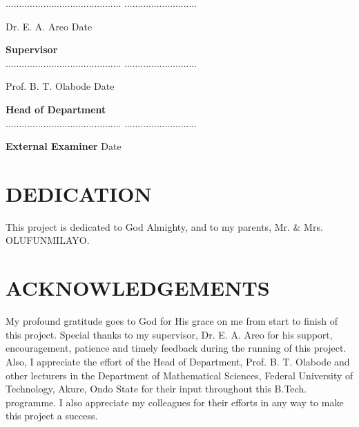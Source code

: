 \documentclass[12pt]{report}
\begin{document}
\noindent........................................... \hspace{10.7cm}
...........................

Dr. E. A. Areo \hspace{13cm} Date

\hspace{6mm}\textbf{Supervisor}\\
[2cm] 

\noindent........................................... \hspace{10.7cm}
...........................

Prof. B. T. Olabode \hspace{12.3cm} Date

\noindent\hspace{4mm}\textbf{Head of Department}\\
[2cm] 

\noindent........................................... \hspace{10.7cm}
...........................

\textbf{External Examiner} \hspace{12.3cm} Date



\chapter*{DEDICATION}
%
\noindent This project is dedicated to God Almighty, and to my parents, Mr. \&  Mrs. OLUFUNMILAYO.

\chapter*{ACKNOWLEDGEMENTS}
%
\noindent My profound gratitude goes to God for His grace on me from start to finish of this project. Special thanks to my supervisor, Dr. E. A. Areo for his support, encouragement, patience and timely feedback during the running of this project. Also, I appreciate the effort of the Head of Department, Prof. B. T. Olabode and other lecturers in the Department of Mathematical Sciences, Federal University of Technology, Akure, Ondo State for their input throughout this B.Tech. programme. I also appreciate my colleagues for their efforts in any way to make this project a success.

\end{document}
